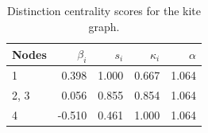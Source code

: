 \begin{table}
\centering
\caption{\label{tab:kitegraph}Distinction centrality scores for the kite graph.}
\centering
\begin{tabular}[t]{lrrrr}
\toprule
Nodes & $\beta_i$ & $s_i$ & $\kappa_i$ & $\alpha$\\
\midrule
1 & 0.398 & 1.000 & 0.667 & 1.064\\
2, 3 & 0.056 & 0.855 & 0.854 & 1.064\\
4 & -0.510 & 0.461 & 1.000 & 1.064\\
\bottomrule
\end{tabular}
\end{table}
